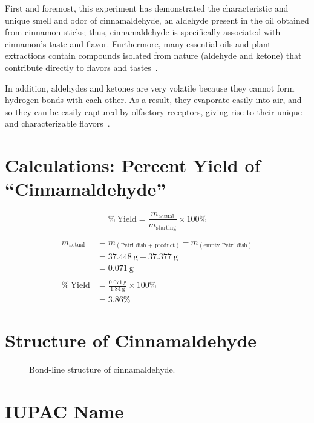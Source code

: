 \documentclass[
  10pt,
  twocolumn,
  letterpaper,
]{article}
\begin{document}
First and foremost, this experiment has demonstrated the characteristic and unique smell and odor of cinnamaldehyde, an aldehyde present in the oil obtained from cinnamon sticks; thus, cinnamaldehyde is specifically associated with cinnamon's taste and flavor. Furthermore, many essential oils and plant extractions contain compounds isolated from nature (aldehyde and ketone) that contribute directly to flavors and tastes~\cite{britannica_essential_oil}.

In addition, aldehydes and ketones are very volatile because they cannot form hydrogen bonds with each other. As a result, they evaporate easily into air, and so they can be easily captured by olfactory receptors, giving rise to their unique and characterizable flavors~\cite{ck12_aldehydes_ketones}.

\section{Calculations: Percent Yield of ``Cinnamaldehyde''}

\begin{equation}
  \%\ \text{Yield} = \frac{m_{\text{actual}}}{m_{\text{starting}}} \times 100\%
  \label{eq:yield}
\end{equation}

\begin{align*}
  m_{\text{actual}} &= m_{(\text{Petri dish + product})} - m_{(\text{empty Petri dish})} \\
  &= \SI{37.448}{\gram} - \SI{37.377}{\gram} \\
  &= \SI{0.071}{\gram} \\
  \\
  \%\ \text{Yield} &= \frac{\SI{0.071}{\gram}}{\SI{1.84}{\gram}} \times 100\% \\
  &= 3.86\%
\end{align*}

\section{Structure of Cinnamaldehyde}

\begin{figure}[H]
  \centering

  \caption{Bond-line structure of cinnamaldehyde.}
  \label{fig:cinnamaldehyde}
\end{figure}

\section{IUPAC Name}
\end{document}
